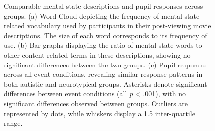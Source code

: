 \begin{figure}[!ht]
    \vspace*{10pt}
	\centering
	\caption{Comparable mental state descriptions and pupil responses across groups. (a) Word Cloud depicting the frequency of mental state-related vocabulary used by participants in their post-viewing movie descriptions. The size of each word corresponds to its frequency of use. (b) Bar graphs displaying the ratio of mental state words to other content-related terms in these descriptions, showing no significant differences between the two groups. (c) Pupil responses across all event conditions, revealing similar response patterns in both autistic and neurotypical groups. Asterisks denote significant differences between event conditions (all \textit{p} < .001), with no significant differences observed between groups. Outliers are represented by dots, while whiskers display a 1.5 inter-quartile range.}
    \vspace*{-10pt}
	\label{fig:beh-pupil-asc}
\end{figure}

